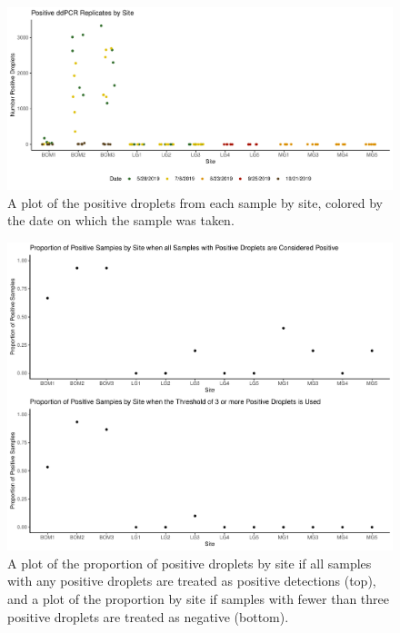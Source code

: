 \documentclass[12pt]{article}\usepackage[]{graphicx}\usepackage[]{color}
\makeatletter
\def\maxwidth{ %
  \ifdim\Gin@nat@width>\linewidth
    \linewidth
  \else
    \Gin@nat@width
  \fi
}
\newenvironment{knitrout}{}{} %
\def\maxwidth{ %
  \ifdim\Gin@nat@width>\linewidth
    \linewidth
  \else
    \Gin@nat@width
  \fi
}
\newenvironment{knitrout}{}{} %
\makeatother
\begin{document}
\begin{figure}[]
\begin{knitrout}
\color{fgcolor}

{\centering \includegraphics[width=\maxwidth]{figure/eDNA_visualization_droplets-1} 

}



\end{knitrout}
\caption{A plot of the positive droplets from each sample by site, colored by the date on which the sample was taken.}
\label{fig:eDNA_droplets}
\end{figure}



\begin{figure}[]
\begin{knitrout}
\color{fgcolor}

{\centering \includegraphics[width=\maxwidth]{figure/eDNA_visualization_sample-1} 

}



\end{knitrout}
\caption{A plot of the proportion of positive droplets by site if all samples with any positive droplets are treated as positive detections (top), and a plot of the proportion by site if samples with fewer than three positive droplets are treated as negative (bottom).}
\label{fig:eDNA_sample}
\end{figure}
\end{document}
